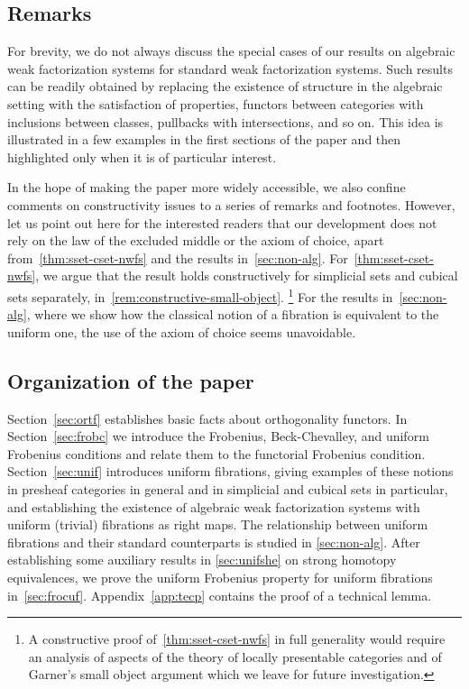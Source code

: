 \documentclass[reqno,10pt,a4paper,oneside,draft]{amsart}
\begin{document}
\subsection*{Remarks}

For brevity, we do not always discuss the special cases of our results on algebraic weak factorization systems for standard weak factorization systems.
Such results can be readily obtained by replacing the existence of structure in the algebraic setting with the satisfaction of properties, functors between categories with inclusions between classes, pullbacks with intersections, and so on.
This idea is illustrated in a few examples in the first sections of the paper and then highlighted only when it is of particular interest.

In the hope of making the paper more widely accessible, we also confine comments on constructivity issues to a series of remarks and footnotes.
However, let us point out here for the interested readers that our development does not rely on the law of the excluded middle or the axiom of choice, apart from~\cref{thm:sset-cset-nwfs} and the results in~\cref{sec:non-alg}.
For~\cref{thm:sset-cset-nwfs}, we argue that the result holds constructively for simplicial sets and cubical sets separately, in~\cref{rem:constructive-small-object}.%
\footnote{A constructive proof of~\cref{thm:sset-cset-nwfs} in full generality would require an analysis of aspects of the theory of locally presentable categories and of Garner's small object argument which we leave for future investigation.}
For the results in~\cref{sec:non-alg}, where we show how the classical notion of a fibration is equivalent to the uniform one, the use of the axiom of choice seems unavoidable.

\subsection*{Organization of the paper}

Section~\ref{sec:ortf} establishes basic facts about orthogonality functors.
In Section~\ref{sec:frobc} we introduce the Frobenius, Beck-Chevalley, and uniform Frobenius conditions and relate them to the functorial Frobenius condition.
Section~\ref{sec:unif} introduces uniform fibrations, giving examples of these notions in presheaf categories in general and in simplicial and cubical sets in particular, and establishing the existence of algebraic weak factorization systems with uniform (trivial) fibrations as right maps.
The relationship between uniform fibrations and their standard counterparts is studied in \cref{sec:non-alg}.
After establishing some auxiliary results in \cref{sec:unifshe} on strong homotopy equivalences, we prove the uniform Frobenius property for uniform fibrations in~\cref{sec:frocuf}.
Appendix~\ref{app:tecp} contains the proof of a technical lemma.
\end{document}
